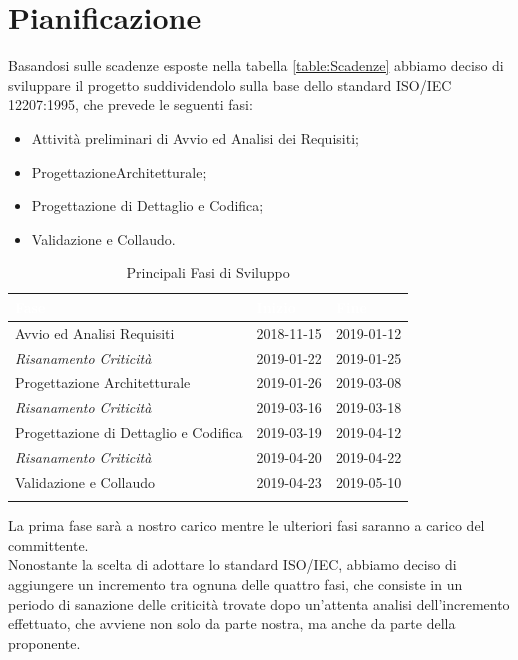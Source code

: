 \section{Pianificazione}
\label{Pianificazione}
Basandosi sulle scadenze esposte nella tabella \ref{table:Scadenze} abbiamo deciso di sviluppare il progetto suddividendolo sulla base dello standard ISO/IEC 12207:1995, che prevede le seguenti fasi:
\begin{itemize}
	\item Attività preliminari di Avvio ed Analisi dei Requisiti;
	\item Progettazione\glossario Architetturale;
	\item Progettazione di Dettaglio e Codifica;
	\item Validazione e Collaudo.
\end{itemize}

\begin{longtable}{|C{.46\textwidth}|C{.20\textwidth}|C{.20\textwidth}|}
\hline
{}\textbf{\textcolor{white}{Fase}} & \textbf{\textcolor{white}{Inizio}} & \textbf{\textcolor{white}{Fine}}
\\
\hline \hline
\endfirsthead
\hline
Avvio ed Analisi Requisiti & 2018-11-15 & 2019-01-12 \\
\hline
{}\textit{Risanamento Criticità} & 2019-01-22 & 2019-01-25 \\
\hline
Progettazione Architetturale & 2019-01-26 & 2019-03-08 \\
\hline
{}\textit{Risanamento Criticità} & 2019-03-16 & 2019-03-18 \\
\hline
Progettazione di Dettaglio e Codifica & 2019-03-19 & 2019-04-12 \\
\hline
{}\textit{Risanamento Criticità} & 2019-04-20 & 2019-04-22 \\
\hline
Validazione e Collaudo & 2019-04-23 & 2019-05-10 \\
\hline
\caption{Principali Fasi di Sviluppo \label{Tabella Fasi di Sviluppo}}
\end{longtable}

La prima fase sarà a nostro carico mentre le ulteriori fasi saranno a carico del committente. \\
Nonostante la scelta di adottare lo standard ISO/IEC, abbiamo deciso di aggiungere un incremento tra ognuna delle quattro fasi, che consiste in un periodo di sanazione delle criticità trovate dopo un'attenta analisi dell'incremento effettuato, che avviene non solo da parte nostra, ma anche da parte della proponente. 


